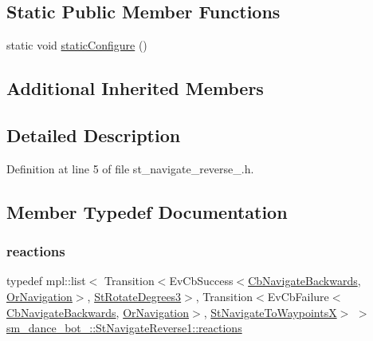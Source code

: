 \subsection*{Static Public Member Functions}
\begin{DoxyCompactItemize}
\item 
static void \hyperlink{structsm__dance__bot__2_1_1StNavigateReverse1_a15d3a1e5f83f03d54113e4d9e7ec7aac}{static\+Configure} ()
\end{DoxyCompactItemize}
\subsection*{Additional Inherited Members}


\subsection{Detailed Description}


Definition at line 5 of file st\+\_\+navigate\+\_\+reverse\+\_.\+h.



\subsection{Member Typedef Documentation}
\mbox{\label{structsm__dance__bot__2_1_1StNavigateReverse1_a29c709f81a04d776277fe903597ef43e}} 
\subsubsection{\texorpdfstring{reactions}{reactions}}
{\footnotesize\ttfamily typedef mpl\+::list$<$ Transition$<$Ev\+Cb\+Success$<$\hyperlink{classcl__move__base__z_1_1CbNavigateBackwards}{Cb\+Navigate\+Backwards}, \hyperlink{classsm__dance__bot__2_1_1OrNavigation}{Or\+Navigation}$>$, \hyperlink{structsm__dance__bot__2_1_1StRotateDegrees3}{St\+Rotate\+Degrees3}$>$, Transition$<$Ev\+Cb\+Failure$<$\hyperlink{classcl__move__base__z_1_1CbNavigateBackwards}{Cb\+Navigate\+Backwards}, \hyperlink{classsm__dance__bot__2_1_1OrNavigation}{Or\+Navigation}$>$, \hyperlink{structsm__dance__bot__2_1_1StNavigateToWaypointsX}{St\+Navigate\+To\+WaypointsX}$>$ $>$ \hyperlink{structsm__dance__bot__2_1_1StNavigateReverse1_a29c709f81a04d776277fe903597ef43e}{sm\+\_\+dance\+\_\+bot\+\_\+::\+St\+Navigate\+Reverse1\+::reactions}}



